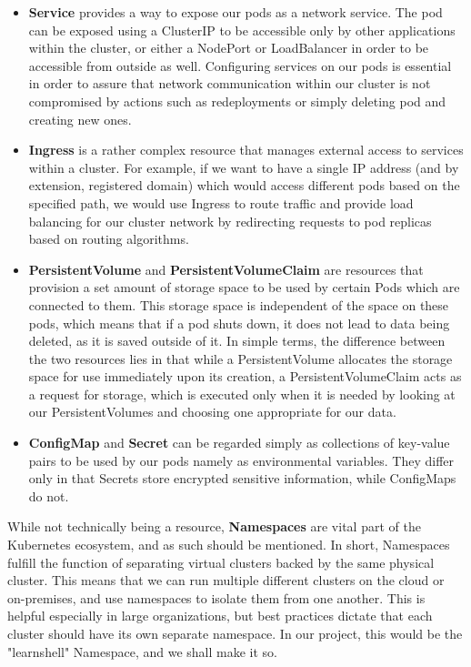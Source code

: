 \documentclass[thesis=B,english]{FITthesis}[2019/12/23]
\begin{document}
\begin{itemize}
  \setlength\itemsep{0em}
  \item \textbf{Service} provides a way to expose our pods as a network service. The pod can be exposed using a ClusterIP to be accessible only by other applications within the cluster, or either a NodePort or LoadBalancer in order to be accessible from outside as well. Configuring services on our pods is essential in order to assure that network communication within our cluster is not compromised by actions such as redeployments or simply deleting pod and creating new ones.
  \item \textbf{Ingress} is a rather complex resource that manages external access to services within a cluster. For example, if we want to have a single IP address (and by extension, registered domain) which would access different pods based on the specified path, we would use Ingress to route traffic and provide load balancing for our cluster network by redirecting requests to pod replicas based on routing algorithms.
  \item \textbf{PersistentVolume} and \textbf{PersistentVolumeClaim} are resources that provision a set amount of storage space to be used by certain Pods which are connected to them. This storage space is independent of the space on these pods, which means that if a pod shuts down, it does not lead to data being deleted, as it is saved outside of it. In simple terms, the difference between the two resources lies in that while a PersistentVolume allocates the storage space for use immediately upon its creation, a PersistentVolumeClaim acts as a request for storage, which is executed only when it is needed by looking at our PersistentVolumes and choosing one appropriate for our data. 
  \item \textbf{ConfigMap} and \textbf{Secret} can be regarded simply as collections of key-value pairs to be used by our pods namely as environmental variables. They differ only in that Secrets store encrypted sensitive information, while ConfigMaps do not.
\end{itemize}

While not technically being a resource, \textbf{Namespaces} are vital part of the Kubernetes ecosystem, and as such should be mentioned. In short, Namespaces fulfill the function of separating virtual clusters backed by the same physical cluster. This means that we can run multiple different clusters on the cloud or on-premises, and use namespaces to isolate them from one another. This is helpful especially in large organizations, but best practices dictate that each cluster should have its own separate namespace. In our project, this would be the "learnshell" Namespace, and we shall make it so.
\end{document}
